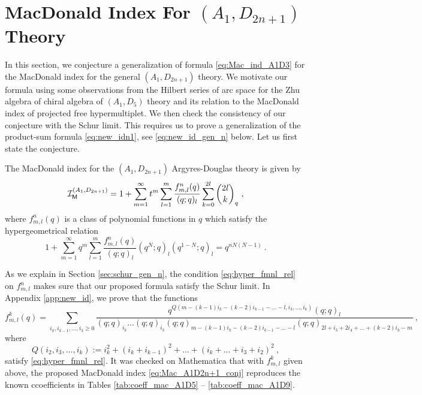 \documentclass[a4paper,10pt]{article}
\newcommand{\mr}[1]{\mathsf{#1}}
\newcommand{\myRed}[1]{\textcolor{red}{#1}}
\def\CI {{\cal I}}
\def\CI {{{\cal I}}}
\begin{document}
\section{MacDonald Index For $(A_1,D_{2n+1})$ Theory}\label{sec:A1D2n+1_Mac_conj}
In this section, we conjecture a generalization of formula \eqref{eq:Mac_ind_A1D3} for the MacDonald index for the general $(A_1,D_{2n+1})$ theory. We motivate our formula using some observations from the Hilbert series of arc space for the Zhu algebra of chiral algebra of $(A_1,D_{5})$ theory and its relation to the MacDonald index of projected free hypermultiplet. We then check the consistency of our conjecture with the Schur limit. This requires us to prove a generalization of the product-sum formula \eqref{eq:new_idn1}, see \eqref{eq:new_id_gen_n} below. 
Let us first state the conjecture.
\begin{conj}
The MacDonald index for the $(A_1, D_{2n+1})$ Argyres-Douglas theory is given by
\begin{equation}\label{eq:Mac_ind_gen_n}
    \CI^{(A_1,D_{2n+1})}_{\mr{M}} = 1 + \sum_{m=1}^\infty 
    t^m \sum_{l=1}^m
    \frac{f^n_{m,l}(q)}{(q;q)_l}\sum_{k=0}^{2l}\binom{2l}{k}_q~,
\end{equation}
where $f^n_{m,l}(q)$ is a class of polynomial functions in $q$ which satisfy the hypergeometrical relation 
\begin{equation}\label{eq:hyper_fmnl_rel}
    1 + \sum_{m=1}^\infty q^m \sum_{l=1}^m 
    \frac{f^n_{m,l}(q)}{(q;q)_l} (q^N; q)_l 
    (q^{1-N};q)_l = q^{nN(N-1)}~.
\end{equation}
\end{conj}
As we explain in Section \ref{sec:schur_gen_n}, the condition \eqref{eq:hyper_fmnl_rel} on $f^n_{m,l}$ makes sure that our proposed formula satisfy the Schur limit. 
In Appendix \ref{app:new_id}, we prove that the functions
\begin{equation}\label{eq:fnml_closed_form_sec5}
f^k_{m,l}(q)=\sum_{i_k,i_{k-1},\dots,i_3\geq 0}\frac{q^{Q(m-(k-1)i_k-(k-2)i_{k-1}-\dots-l,i_3,\dots,i_k)}(q;q)_{l}}{(q;q)_{i_k}\dots (q;q)_{i_3}(q;q)_{m-(k-1)i_k-(k-2)i_{k-1}-\dots-l}(q;q)_{2l+i_3+2i_4+\dots+(k-2)i_k-m}}~,    
\end{equation}
where 
\begin{equation}\label{eq:Q_def_sec5}
    Q(i_2,i_3,\dots,i_k):=i_k^2+(i_k+i_{k-1})^2+\dots+(i_k+\dots+i_3+i_2)^2~,
\end{equation}
satisfy \eqref{eq:hyper_fmnl_rel}. It was checked on Mathematica that with $f^k_{m,l}$ given above, the proposed MacDonald index \eqref{eq:Mac_A1D2n+1_conj} reproduces the known ccoefficients in Tables \ref{tab:coeff_mac_A1D5} -- \ref{tab:coeff_mac_A1D9}.
\end{document}
